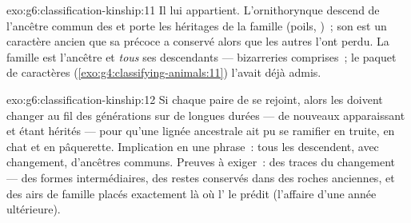 \begin{solution}{exo:g6:classification-kinship:11}
Il lui appartient. L'ornithorynque descend de l'ancêtre commun des
 et porte les héritages de la famille (poils, )~; son
 est un caractère ancien que sa  précoce a conservé alors
que les autres l'ont perdu. La famille est l'ancêtre et \emph{tous}
ses descendants --- bizarreries comprises~; le paquet de caractères
(\cref{exo:g4:classifying-animals:11}) l'avait déjà admis.
\end{solution}

\begin{solution}{exo:g6:classification-kinship:12}
Si chaque paire de  se rejoint, alors les  doivent
changer au fil des générations sur de longues durées --- de nouveaux
 apparaissant et étant hérités --- pour qu'une lignée
ancestrale ait pu se ramifier en truite, en chat et en pâquerette.
Implication en une phrase~: tous les  descendent, avec
changement, d'ancêtres communs. Preuves à exiger~: des traces du
changement --- des formes intermédiaires, des restes conservés dans
des roches anciennes, et des airs de famille placés exactement là où
l' le prédit (l'affaire d'une année ultérieure).
\end{solution}

